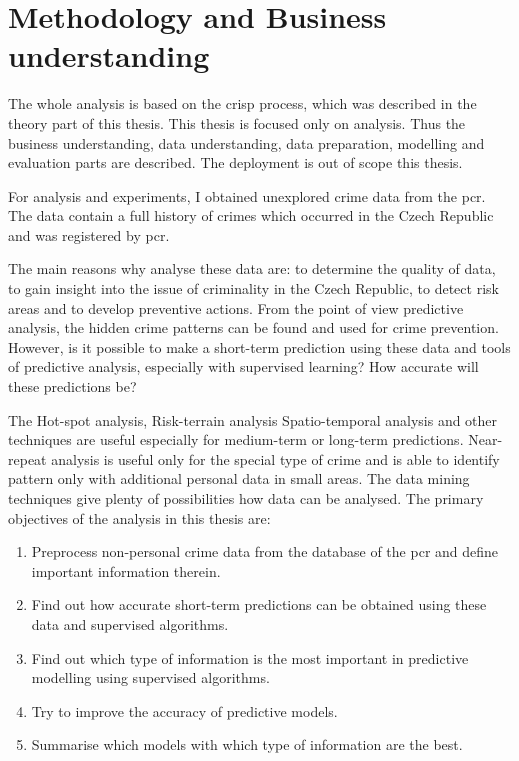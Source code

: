 \documentclass[thesis=M,english]{FITthesis}[2012/10/20]
\begin{document}
\section{Methodology and Business understanding}

The whole analysis is based on the \gls{crisp} process, which was described in the theory part of this thesis. This thesis is focused only on analysis. Thus the business understanding, data understanding, data preparation, modelling and evaluation parts are described. The deployment is out of scope this thesis. 

For analysis and experiments, I obtained unexplored crime data from the \gls{pcr}. The data contain a full history of crimes which occurred in the Czech Republic and was registered by \gls{pcr}.

The main reasons why analyse these data are: to determine the quality of data, to gain insight into the issue of criminality in the Czech Republic, to detect risk areas and to develop preventive actions. From the point of view predictive analysis, the hidden crime patterns can be found and used for crime prevention. However, is it possible to make a short-term prediction using these data and tools of predictive analysis, especially with supervised learning? How accurate will these predictions be? 

The Hot-spot analysis, Risk-terrain analysis Spatio-temporal analysis and other techniques are useful especially for medium-term or long-term predictions. Near-repeat analysis is useful only for the special type of crime and is able to identify pattern only with additional personal data in small areas. The data mining techniques give plenty of possibilities how data can be analysed. The primary objectives of the analysis in this thesis are:

\begin{enumerate}
    \item Preprocess non-personal crime data from the database of the \gls{pcr} and define important information therein.
    \item Find out how accurate short-term predictions can be obtained using these data and supervised algorithms.
    \item Find out which type of information is the most important in predictive modelling using supervised algorithms. 
    \item Try to improve the accuracy of predictive models.
    \item Summarise which models with which type of information are the best. 
\end{enumerate}
\end{document}
